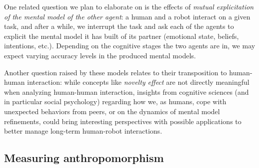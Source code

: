 \documentclass{frontiersSCNS} %
\begin{document}
One related question we plan to elaborate on is the effects of \emph{mutual
explicitation of the mental model of the other agent}: a human and a robot
interact on a given task, and after a while, we interrupt the task and ask each
of the agents to explicit the mental model it has built of its partner
(emotional state, beliefs, intentions, etc.). Depending on the cognitive stages
the two agents are in, we may expect varying accuracy levels in the produced
mental models.

Another question raised by these models relates to their transposition to
human-human interaction: while concepts like \emph{novelty effect} are not
directly meaningful when analyzing human-human interaction, insights from
cognitive sciences (and in particular social psychology) regarding how we, as
humans, cope with unexpected behaviors from peers, or on the dynamics of mental
model refinements, could bring interesting perspectives with possible
applications to better manage long-term human-robot interactions.

\subsection{Measuring anthropomorphism}
\label{sec:measuring}


\citep{ruijten_introducing_2014}
\end{document}
